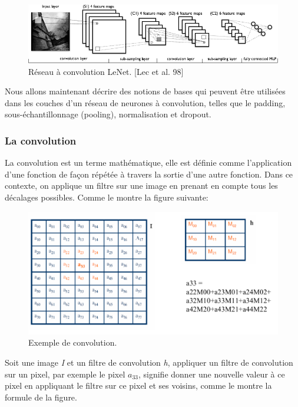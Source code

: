 \begin{figure}[H]
	\centering
		\includegraphics[width=5in]{Figures/Mylenet.png}
	\caption[An Electron]{Réseau à convolution LeNet. [Lec et al. 98]}
	\label{fig:Electron}
\end{figure}

	Nous allons maintenant décrire des notions de bases qui peuvent être utilisées dans les couches d'un réseau de neurones à convolution, telles que le padding, sous-échantillonnage (pooling), normalisation et dropout.

\subsubsection{La convolution}
	
	La convolution est un terme mathématique, elle est définie comme l'application d'une fonction de façon répétée à travers la sortie d'une autre fonction. Dans ce contexte, on applique un filtre sur une image en prenant en compte tous les décalages possibles. Comme le montre la figure suivante:


\begin{figure}[H]
	\centering
		\includegraphics[width=5in]{Figures/convAouat.png}
	\caption[An Electron]{Exemple de convolution.}
	\label{fig:Electron}
\end{figure}

	Soit une image \textit{I} et un filtre de convolution \textit{h}, appliquer un filtre de convolution sur un pixel, par exemple le pixel \textit{$a_{33}$}, signifie donner une nouvelle valeur à ce pixel en appliquant le filtre sur ce pixel et ses voisins, comme le montre la formule de la figure.
	
